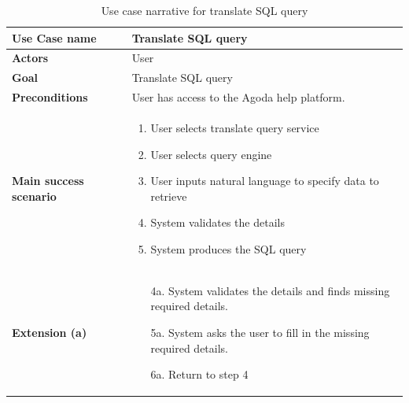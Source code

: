     \begin{table}[H]
        \centering
        \caption{Use case narrative for translate SQL query}
        \label{tbl:use-case-translate-sql}
        \begin{tabular}{|p{4cm}|p{10cm}|}
        \hline
        \textbf{Use Case name} & Translate SQL query \\ \hline
        \textbf{Actors} & User \\ \hline
        \textbf{Goal} & Translate SQL query \\ \hline
        \textbf{Preconditions} & User has access to the Agoda help platform. \\ \hline
        \textbf{Main success scenario} & 
        \begin{enumerate}
            \item User selects translate query service
            \item User selects query engine
            \item User inputs natural language to specify data to retrieve
            \item System validates the details
            \item System produces the SQL query
        \end{enumerate}
        \\ \hline
        \textbf{Extension (a)} & 
        \begin{enumerate}
            \item[4a.] System validates the details and finds missing required details.
            \item[5a.] System asks the user to fill in the missing required details.
            \item[6a.] Return to step 4
        \end{enumerate}
        \\ \hline
        \end{tabular}
    \end{table}
